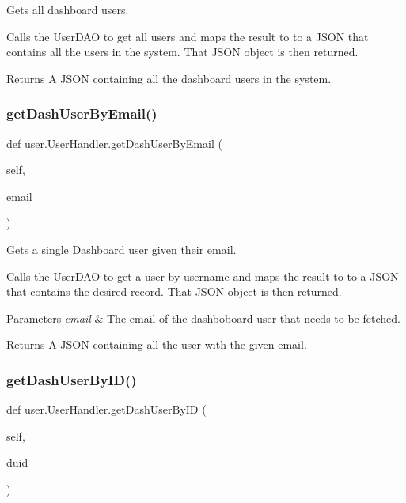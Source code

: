 Gets all dashboard users. 

Calls the User\+D\+AO to get all users and maps the result to to a J\+S\+ON that contains all the users in the system. That J\+S\+ON object is then returned.

\begin{DoxyReturn}{Returns}
A J\+S\+ON containing all the dashboard users in the system. 
\end{DoxyReturn}
\mbox{\label{classuser_1_1_user_handler_af262a3beb9f7fffcf266e065edf7b810}} 
\subsubsection{\texorpdfstring{get\+Dash\+User\+By\+Email()}{getDashUserByEmail()}}
{\footnotesize\ttfamily def user.\+User\+Handler.\+get\+Dash\+User\+By\+Email (\begin{DoxyParamCaption}\item[{}]{self,  }\item[{}]{email }\end{DoxyParamCaption})}



Gets a single Dashboard user given their email. 

Calls the User\+D\+AO to get a user by username and maps the result to to a J\+S\+ON that contains the desired record. That J\+S\+ON object is then returned.


\begin{DoxyParams}{Parameters}
{\em email} & The email of the dashboboard user that needs to be fetched.\\
\hline
\end{DoxyParams}
\begin{DoxyReturn}{Returns}
A J\+S\+ON containing all the user with the given email. 
\end{DoxyReturn}
\mbox{\label{classuser_1_1_user_handler_ad42271d6f499db1db53febb34a1f633f}} 
\subsubsection{\texorpdfstring{get\+Dash\+User\+By\+I\+D()}{getDashUserByID()}}
{\footnotesize\ttfamily def user.\+User\+Handler.\+get\+Dash\+User\+By\+ID (\begin{DoxyParamCaption}\item[{}]{self,  }\item[{}]{duid }\end{DoxyParamCaption})}



